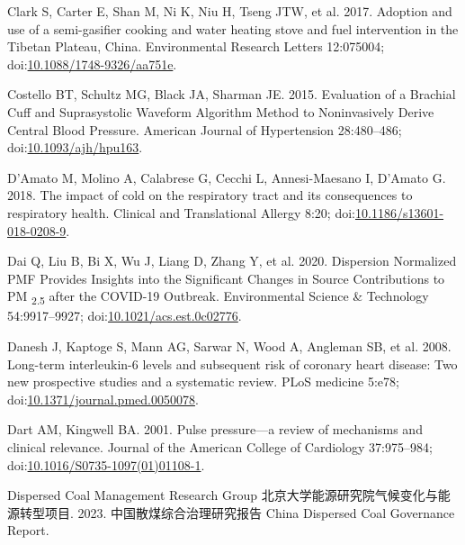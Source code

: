 \documentclass[
  letterpaper,
  DIV=11,
  numbers=noendperiod]{scrartcl}
\newlength{\cslhangindent}
\newlength{\cslentryspacingunit} %
\newenvironment{CSLReferences}[2] %
 {%
  \setlength{\parindent}{0pt}
  \ifodd #1
  \let\oldpar\par
  \def\par{\hangindent=\cslhangindent\oldpar}
  \fi
  \setlength{\parskip}{#2\cslentryspacingunit}
 }%
 {}
\begin{document}
\begin{CSLReferences}{1}{0}
\leavevmode{}%
Clark S, Carter E, Shan M, Ni K, Niu H, Tseng JTW, et al. 2017. Adoption
and use of a semi-gasifier cooking and water heating stove and fuel
intervention in the {Tibetan Plateau}, {China}. Environmental Research
Letters 12:075004;
doi:\href{https://doi.org/10.1088/1748-9326/aa751e}{10.1088/1748-9326/aa751e}.

\leavevmode{}%
Costello BT, Schultz MG, Black JA, Sharman JE. 2015. Evaluation of a
{Brachial Cuff} and {Suprasystolic Waveform Algorithm Method} to
{Noninvasively Derive Central Blood Pressure}. American Journal of
Hypertension 28:480--486;
doi:\href{https://doi.org/10.1093/ajh/hpu163}{10.1093/ajh/hpu163}.

\leavevmode{}%
D'Amato M, Molino A, Calabrese G, Cecchi L, Annesi-Maesano I, D'Amato G.
2018. The impact of cold on the respiratory tract and its consequences
to respiratory health. Clinical and Translational Allergy 8:20;
doi:\href{https://doi.org/10.1186/s13601-018-0208-9}{10.1186/s13601-018-0208-9}.

\leavevmode{}%
Dai Q, Liu B, Bi X, Wu J, Liang D, Zhang Y, et al. 2020. Dispersion
{Normalized PMF Provides Insights} into the {Significant Changes} in
{Source Contributions} to {PM} {\textsubscript{2.5}} after the {COVID-19
Outbreak}. Environmental Science \& Technology 54:9917--9927;
doi:\href{https://doi.org/10.1021/acs.est.0c02776}{10.1021/acs.est.0c02776}.

\leavevmode{}%
Danesh J, Kaptoge S, Mann AG, Sarwar N, Wood A, Angleman SB, et al.
2008. Long-term interleukin-6 levels and subsequent risk of coronary
heart disease: Two new prospective studies and a systematic review. PLoS
medicine 5:e78;
doi:\href{https://doi.org/10.1371/journal.pmed.0050078}{10.1371/journal.pmed.0050078}.

\leavevmode{}%
Dart AM, Kingwell BA. 2001. Pulse pressure---a review of mechanisms and
clinical relevance. Journal of the American College of Cardiology
37:975--984;
doi:\href{https://doi.org/10.1016/S0735-1097(01)01108-1}{10.1016/S0735-1097(01)01108-1}.

\leavevmode{}%
Dispersed Coal Management Research Group
北京大学能源研究院气候变化与能源转型项目. 2023. 中国散煤综合治理研究报告
{China Dispersed Coal Governance Report}.


\end{CSLReferences}
\end{document}
